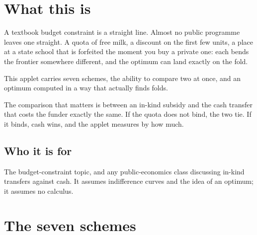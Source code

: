 \documentclass[11pt,a4paper]{appletmanual}
\begin{document}

\manualtoc
\thispagestyle{empty}
\clearpage
\setcounter{page}{1}

\section{What this is}

A textbook budget constraint is a straight line. Almost no public programme
leaves one straight. A quota of free milk, a discount on the first few units, a
place at a state school that is forfeited the moment you buy a private one:
each bends the frontier somewhere different, and the optimum can land exactly
on the fold.

This applet carries seven schemes, the ability to compare two at once, and an
optimum computed in a way that actually finds folds.


\begin{amkey}
The comparison that matters is between an in-kind subsidy and the cash transfer
that costs the funder exactly the same. If the quota does not bind, the two
tie. If it binds, cash wins, and the applet measures by how much.
\end{amkey}

\subsection{Who it is for}

The budget-constraint topic, and any public-economics class discussing in-kind
transfers against cash. It assumes indifference curves and the idea of an
optimum; it assumes no calculus.



\section{The seven schemes}
\end{document}
